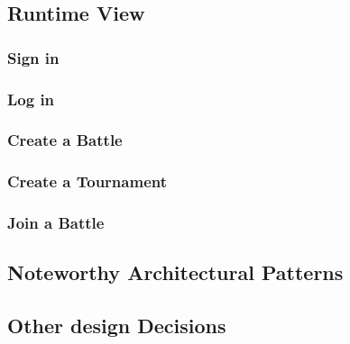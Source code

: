 \subsection{Runtime View}
\subsubsection{Sign in}
\subsubsection{Log in}
\subsubsection{Create a Battle}
\subsubsection{Create a Tournament}
\subsubsection{Join a Battle}
\subsection{Noteworthy Architectural Patterns}
\subsection{Other design Decisions}